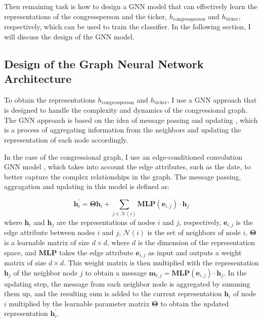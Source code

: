 \documentclass[15pt,letterpaper]{article}
\begin{document}
Then remaining task is how to design a GNN model that can effectively learn the representations of the congressperson and the ticker, $h_{\text{congressperson}}$ and $h_{\text{ticker}}$, respectively, which can be used to train the classifier. In the following section, I will discuss the design of the GNN model.

\subsection{Design of the Graph Neural Network Architecture}

To obtain the representations $h_{\text{congressperson}}$ and $h_{\text{ticker}}$, I use a GNN approach that is designed to handle the complexity and dynamics of the congressional graph. The GNN approach is based on the idea of message passing and updating \citep{gnn1, gnn2}, which is a process of aggregating information from the neighbors and updating the representation of each node accordingly.

In the case of the congressional graph, I use an edge-conditioned convolution GNN model \citep{nnconv1, nnconv2}, which takes into account the edge attributes, such as the date, to better capture the complex relationships in the graph. The message passing, aggragation and updating in this model is defined as:

$$
\mathbf{h}_i^{\prime}=\boldsymbol{\Theta} \mathbf{h}_i+\sum_{j \in \mathcal{N}(i)}  \mathbf{MLP}\left(\mathbf{e}_{i, j}\right) \cdot \mathbf{h}_j
$$
where $\mathbf{h}_i$ and $\mathbf{h}_j$ are the representations of nodes $i$ and $j$, respectively, $\mathbf{e}_{i,j}$ is the edge attribute between nodes $i$ and $j$, $\mathcal{N}(i)$ is the set of neighbors of node $i$, $\boldsymbol{\Theta}$ is a learnable matrix of size $d \times d$, where $d$ is the dimension of the representation space, and $\mathbf{MLP}$ takes the edge attribute $\mathbf{e}_{i,j}$ as input and outputs a weight matrix of size $d \times d$. 
This weight matrix is then multiplied with the representation $\mathbf{h}_j$ of the neighbor node $j$ to obtain a message $\mathbf{m}_{i,j}= \mathbf{M L P}\left(\mathbf{e}_{i, j}\right) \cdot \mathbf{h}_j$. In the updating step, the message from each neighbor node is aggregated by summing them up, and the resulting sum is added to the current representation $\mathbf{h}_i$ of node $i$ multiplied by the learnable parameter matrix $\boldsymbol{\Theta}$ to obtain the updated representation $\mathbf{h}_i^{\prime}$.
\end{document}
